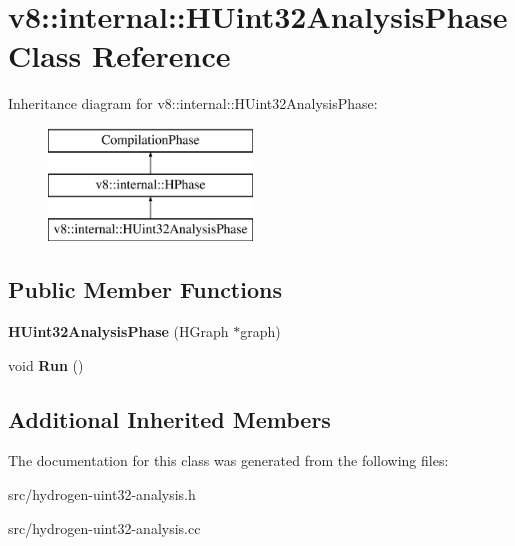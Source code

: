 \hypertarget{classv8_1_1internal_1_1_h_uint32_analysis_phase}{}\section{v8\+:\+:internal\+:\+:H\+Uint32\+Analysis\+Phase Class Reference}
\label{classv8_1_1internal_1_1_h_uint32_analysis_phase}
Inheritance diagram for v8\+:\+:internal\+:\+:H\+Uint32\+Analysis\+Phase\+:\begin{figure}[H]
\begin{center}
\leavevmode
\includegraphics[height=3.000000cm]{classv8_1_1internal_1_1_h_uint32_analysis_phase}
\end{center}
\end{figure}
\subsection*{Public Member Functions}
\begin{DoxyCompactItemize}
\item 
\hypertarget{classv8_1_1internal_1_1_h_uint32_analysis_phase_a7bcb34094c72261b94aa89ed61afa7ce}{}{\bfseries H\+Uint32\+Analysis\+Phase} (H\+Graph $\ast$graph)\label{classv8_1_1internal_1_1_h_uint32_analysis_phase_a7bcb34094c72261b94aa89ed61afa7ce}

\item 
\hypertarget{classv8_1_1internal_1_1_h_uint32_analysis_phase_a733477b631c72e34fdf845765efb826d}{}void {\bfseries Run} ()\label{classv8_1_1internal_1_1_h_uint32_analysis_phase_a733477b631c72e34fdf845765efb826d}

\end{DoxyCompactItemize}
\subsection*{Additional Inherited Members}


The documentation for this class was generated from the following files\+:\begin{DoxyCompactItemize}
\item 
src/hydrogen-\/uint32-\/analysis.\+h\item 
src/hydrogen-\/uint32-\/analysis.\+cc\end{DoxyCompactItemize}
